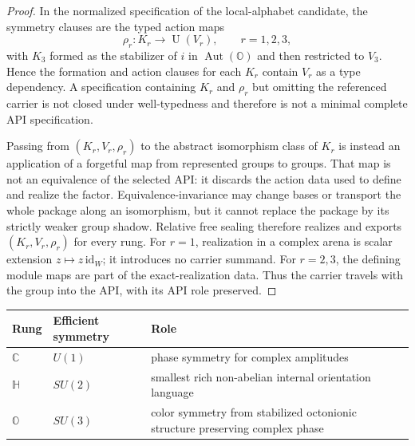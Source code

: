 \documentclass[11pt]{article}
\theoremstyle{plain}
\theoremstyle{definition}
\theoremstyle{remark}
\newcommand{\Aut}{\operatorname{Aut}}
\newcommand{\C}{\mathbb{C}}
\newcommand{\HH}{\mathbb{H}}
\newcommand{\OO}{\mathbb{O}}
\begin{document}
\begin{proof}
In the normalized specification of the local-alphabet candidate, the symmetry
clauses are the typed action maps
\[
\rho_r:K_r\longrightarrow\operatorname{U}(V_r),\qquad r=1,2,3,
\]
with \(K_3\) formed as the stabilizer of \(i\) in \(\Aut(\OO)\) and then
restricted to \(V_3\).  Hence the formation and action clauses for each
\(K_r\) contain \(V_r\) as a type dependency.  A specification containing
\(K_r\) and \(\rho_r\) but omitting the referenced carrier is not closed under
well-typedness and therefore is not a minimal complete API specification.

Passing from \((K_r,V_r,\rho_r)\) to the abstract isomorphism class of \(K_r\)
is instead an application of a forgetful map from represented groups to
groups.  That map is not an equivalence of the selected API: it discards the
action data used to define and realize the factor.  Equivalence-invariance may
change bases or transport the whole package along an isomorphism, but it cannot
replace the package by its strictly weaker group shadow.  Relative free sealing
therefore realizes and exports \((K_r,V_r,\rho_r)\) for every rung.  For
\(r=1\), realization in a complex arena is scalar extension
\(z\mapsto z\,\mathrm{id}_W\); it introduces no carrier summand.  For
\(r=2,3\), the defining module maps are part of the exact-realization data.
Thus the carrier travels with the group into the API, with its API role
preserved.  \qedhere
\end{proof}

\begin{center}
\small
\begin{tabularx}{\textwidth}{l l Y}
\toprule
Rung & Efficient symmetry & Role \\
\midrule
\(\C\) & \(U(1)\) & phase symmetry for complex amplitudes \\
\(\HH\) & \(SU(2)\) & smallest rich non-abelian internal orientation language \\
\(\OO\) & \(SU(3)\) & color symmetry from stabilized octonionic structure preserving complex phase \\
\bottomrule
\end{tabularx}
\end{center}
\end{document}
